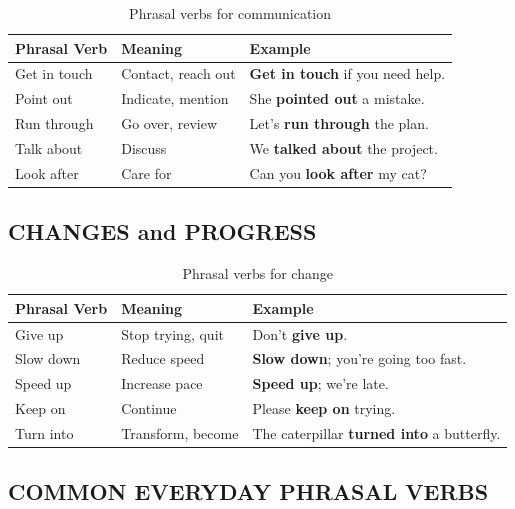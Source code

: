 \begin{table}[h]
\centering
\begin{tabular}{|l|l|l|}
\hline
\textbf{Phrasal Verb} & \textbf{Meaning} & \textbf{Example} \\
\hline
Get in touch & Contact, reach out & \textbf{Get in touch} if you need help. \\
\hline
Point out & Indicate, mention & She \textbf{pointed out} a mistake. \\
\hline
Run through & Go over, review & Let's \textbf{run through} the plan. \\
\hline
Talk about & Discuss & We \textbf{talked about} the project. \\
\hline
Look after & Care for & Can you \textbf{look after} my cat? \\
\hline
\end{tabular}
\caption{Phrasal verbs for communication}
\end{table}

\subsection{CHANGES and PROGRESS}

\begin{table}[h]
\centering
\begin{tabular}{|l|l|l|}
\hline
\textbf{Phrasal Verb} & \textbf{Meaning} & \textbf{Example} \\
\hline
Give up & Stop trying, quit & Don't \textbf{give up}. \\
\hline
Slow down & Reduce speed & \textbf{Slow down}; you're going too fast. \\
\hline
Speed up & Increase pace & \textbf{Speed up}; we're late. \\
\hline
Keep on & Continue & Please \textbf{keep on} trying. \\
\hline
Turn into & Transform, become & The caterpillar \textbf{turned into} a butterfly. \\
\hline
\end{tabular}
\caption{Phrasal verbs for change}
\end{table}

\subsection{COMMON EVERYDAY PHRASAL VERBS}


